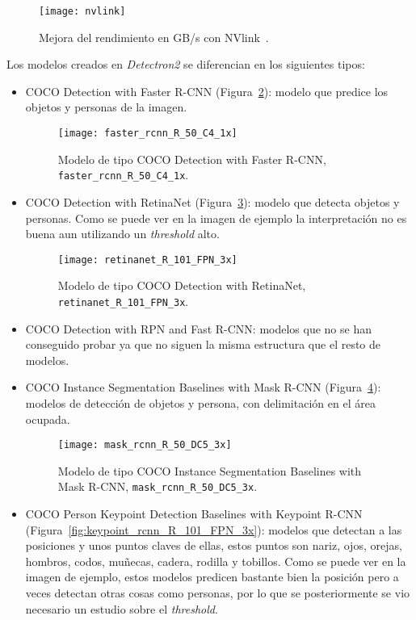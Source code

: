 \begin{figure}[h]
	\centering
	\texttt{[image: nvlink]}
	\caption{Mejora del rendimiento en GB/s con NVlink~\cite{nvlink}.}
	\label{fig:nvlink}
\end{figure}

Los modelos creados en \textit{Detectron2} se diferencian en los siguientes tipos:
\begin{itemize}
	\item COCO Detection with Faster R-CNN (Figura~\ref{fig:faster_rcnn_R_50_C4_1x}): modelo que predice los objetos y personas de la imagen.
	\begin{figure}[h]
		\centering
		\texttt{[image: faster\_rcnn\_R\_50\_C4\_1x]}
		\caption{Modelo de tipo COCO Detection with Faster R-CNN, \texttt{faster\_rcnn\_R\_50\_C4\_1x}.}
		\label{fig:faster_rcnn_R_50_C4_1x}
	\end{figure}
	\item COCO Detection with RetinaNet (Figura~\ref{fig:retinanet_R_101_FPN_3x}): modelo que detecta objetos y personas. Como se puede ver en la imagen de ejemplo la interpretación no es buena aun utilizando un \textit{threshold} alto.
	\begin{figure}[h]
		\centering
		\texttt{[image: retinanet\_R\_101\_FPN\_3x]}
		\caption{Modelo de tipo COCO Detection with RetinaNet, \texttt{retinanet\_R\_101\_FPN\_3x}.}
		\label{fig:retinanet_R_101_FPN_3x}
	\end{figure}
	\item COCO Detection with RPN and Fast R-CNN: modelos que no se han conseguido probar ya que no siguen la misma estructura que el resto de modelos.
	\item COCO Instance Segmentation Baselines with Mask R-CNN (Figura~\ref{fig:mask_rcnn_R_50_DC5_3x}): modelos de detección de objetos y persona, con delimitación en el área ocupada.
	\begin{figure}[h]
		\centering
		\texttt{[image: mask\_rcnn\_R\_50\_DC5\_3x]}
		\caption{Modelo de tipo COCO Instance Segmentation Baselines with Mask R-CNN, \texttt{mask\_rcnn\_R\_50\_DC5\_3x}.}
		\label{fig:mask_rcnn_R_50_DC5_3x}
	\end{figure}
	\item COCO Person Keypoint Detection Baselines with Keypoint R-CNN (Figura~\ref{fig:keypoint_rcnn_R_101_FPN_3x}): modelos que detectan a las posiciones y unos puntos claves de ellas, estos puntos son nariz, ojos, orejas, hombros, codos, muñecas, cadera, rodilla y tobillos. Como se puede ver en la imagen de ejemplo, estos modelos predicen bastante bien la posición pero a veces detectan otras cosas como personas, por lo que se posteriormente se vio necesario un estudio sobre el \textit{threshold}.

\end{itemize}
